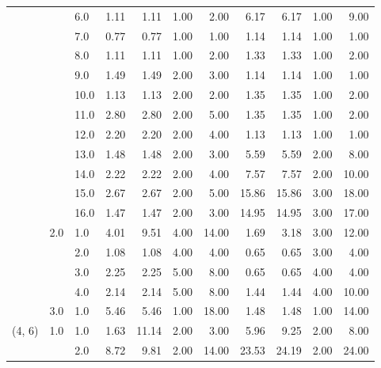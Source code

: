 \begin{tabular}{lllrrrrrrrr}
       &     & 6.0  &       1.11 &      1.11 &  1.00 &   2.00 &       6.17 &      6.17 & 1.00 &   9.00 \\
       &     & 7.0  &       0.77 &      0.77 &  1.00 &   1.00 &       1.14 &      1.14 & 1.00 &   1.00 \\
       &     & 8.0  &       1.11 &      1.11 &  1.00 &   2.00 &       1.33 &      1.33 & 1.00 &   2.00 \\
       &     & 9.0  &       1.49 &      1.49 &  2.00 &   3.00 &       1.14 &      1.14 & 1.00 &   1.00 \\
       &     & 10.0 &       1.13 &      1.13 &  2.00 &   2.00 &       1.35 &      1.35 & 1.00 &   2.00 \\
       &     & 11.0 &       2.80 &      2.80 &  2.00 &   5.00 &       1.35 &      1.35 & 1.00 &   2.00 \\
       &     & 12.0 &       2.20 &      2.20 &  2.00 &   4.00 &       1.13 &      1.13 & 1.00 &   1.00 \\
       &     & 13.0 &       1.48 &      1.48 &  2.00 &   3.00 &       5.59 &      5.59 & 2.00 &   8.00 \\
       &     & 14.0 &       2.22 &      2.22 &  2.00 &   4.00 &       7.57 &      7.57 & 2.00 &  10.00 \\
       &     & 15.0 &       2.67 &      2.67 &  2.00 &   5.00 &      15.86 &     15.86 & 3.00 &  18.00 \\
       &     & 16.0 &       1.47 &      1.47 &  2.00 &   3.00 &      14.95 &     14.95 & 3.00 &  17.00 \\
       & 2.0 & 1.0  &       4.01 &      9.51 &  4.00 &  14.00 &       1.69 &      3.18 & 3.00 &  12.00 \\
       &     & 2.0  &       1.08 &      1.08 &  4.00 &   4.00 &       0.65 &      0.65 & 3.00 &   4.00 \\
       &     & 3.0  &       2.25 &      2.25 &  5.00 &   8.00 &       0.65 &      0.65 & 4.00 &   4.00 \\
       &     & 4.0  &       2.14 &      2.14 &  5.00 &   8.00 &       1.44 &      1.44 & 4.00 &  10.00 \\
       & 3.0 & 1.0  &       5.46 &      5.46 &  1.00 &  18.00 &       1.48 &      1.48 & 1.00 &  14.00 \\
(4, 6) & 1.0 & 1.0  &       1.63 &     11.14 &  2.00 &   3.00 &       5.96 &      9.25 & 2.00 &   8.00 \\
       &     & 2.0  &       8.72 &      9.81 &  2.00 &  14.00 &      23.53 &     24.19 & 2.00 &  24.00 \\

\end{tabular}
